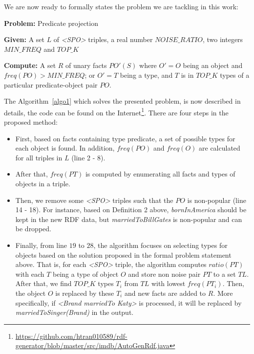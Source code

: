 \documentclass{acm_proc_article-sp}
\begin{document}
We are now ready to formally states the problem we are tackling in this work:

\begin{framed}
\textbf{Problem:} Predicate projection

\textbf{Given:} A set $L$ of \textit{<SPO>} triples, a real number $NOISE\_RATIO$, two integers $MIN\_FREQ$ and $TOP\_K$

\textbf{Compute:} A set $R$ of unary facts $PO'(S)$ where $O' = O$ being an object and $freq(PO) > MIN\_FREQ$; or $O' = T$ being a type, and $T$ is in $TOP\_K$ types of a particular predicate-object pair $PO$.
\end{framed}

The Algorithm~\ref{algo1} which solves the presented problem, is now described in details, the code can be found on the Internet\footnote{\url{https://github.com/htran010589/rdf-generator/blob/master/src/imdb/AutoGenRdf.java}}. There are four steps in the proposed method:
\begin{itemize}
\item First, based on facts containing type predicate, a set of possible types for each object is found. In addition, $freq(PO)$ and $freq(O)$ are calculated for all triples in $L$ (line 2 - 8).
\item After that, $freq(PT)$ is computed by enumerating all facts and types of objects in a triple.
\item Then, we remove some \textit{<SPO>} triples such that the $PO$ is non-popular (line 14 - 18). For instance, based on Definition 2 above, \textit{bornInAmerica} should be kept in the new RDF data, but \textit{marriedToBillGates} is non-popular and can be dropped.
\item Finally, from line $19$ to $28$, the algorithm focuses on selecting types for objects based on the solution proposed in the formal problem statement above. That is, for each \textit{<SPO>} triple, the algorithm computes $ratio(PT)$ with each $T$ being a type of object $O$ and store non noise pair $PT$ to a set $TL$. After that, we find $TOP\_K$ types $T_{i}$ from $TL$ with lowest $freq(PT_{i})$. Then, the object $O$ is replaced by these $T_{i}$ and new facts are added to $R$. More specifically, if \textit{<Brand marriedTo Katy>} is processed, it will be replaced by \textit{marriedToSinger(Brand)} in the output.
\end{itemize}
\end{document}
